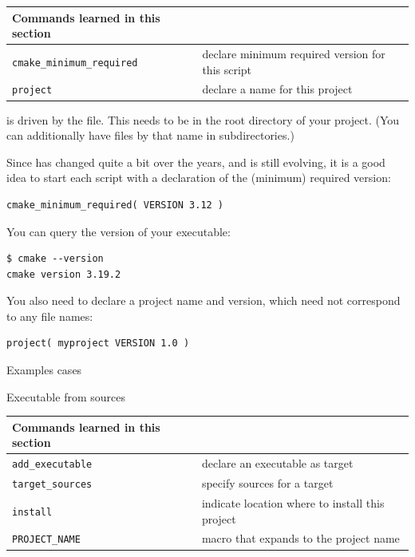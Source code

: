 \begin{tabular}{lp{3in}}
  \toprule
  Commands learned in this section\\
  \midrule
  \lstinline+cmake_minimum_required+&declare minimum required version for this script\\
  \lstinline+project+&declare a name for this project\\
  \bottomrule
\end{tabular}

 is driven by the  file.
This needs to be in the root directory of your project.
(You can additionally have files by that name in subdirectories.)

Since  has changed quite a bit over the years,
and is still evolving,
it is a good idea to start each script with a declaration
of the (minimum) required version:
\begin{lstlisting}
cmake_minimum_required( VERSION 3.12 )
\end{lstlisting}
You can query the version of your  executable:
\begin{lstlisting}[language=shell]
$ cmake --version
cmake version 3.19.2
\end{lstlisting}

You also need to declare a project name and version,
which need not correspond to any file names:
\begin{lstlisting}
project( myproject VERSION 1.0 )
\end{lstlisting}

\newpage
{} {Examples cases}

 {Executable from sources}
\label{sec:cmake-from-source}


\begin{tabular}{lp{3in}}
  \toprule
  Commands learned in this section\\
  \midrule
  \lstinline+add_executable+&declare an executable as target\\
  \lstinline+target_sources+&specify sources for a target\\
  \lstinline+install+&indicate location where to install this project\\
  \lstinline+PROJECT_NAME+&macro that expands to the project name \\
  \bottomrule
\end{tabular}


